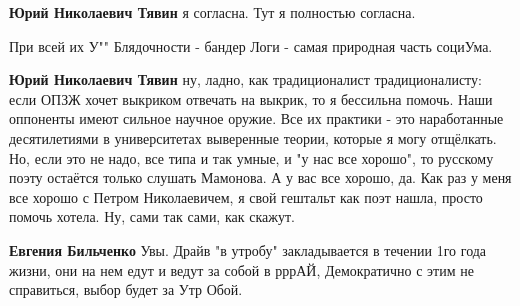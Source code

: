 \begin{itemize}
\begin{itemize}
 
\textbf{Юрий Николаевич Тявин} я согласна. Тут я полностью согласна.

 
При всей их У"" Блядочности - бандер Логи - самая природная часть социУма.

 
\textbf{Юрий Николаевич Тявин} ну, ладно, как традиционалист традиционалисту:
если ОПЗЖ хочет выкриком отвечать на выкрик, то я бессильна помочь. Наши
оппоненты имеют сильное научное оружие. Все их практики - это наработанные
десятилетиями в университетах выверенные теории, которые я могу отщёлкать. Но,
если это не надо, все типа и так умные, и "у нас все хорошо", то русскому поэту
остаётся только слушать Мамонова. А у вас все хорошо, да. Как раз у меня все
хорошо с Петром Николаевичем, я свой гештальт как поэт нашла, просто помочь
хотела. Ну, сами так сами, как скажут.

 
\textbf{Евгения Бильченко} Увы. Драйв "в утробу" закладывается в течении 1го года жизни, они на нем едут и ведут за собой в рррАЙ, Демократично с этим не справиться, выбор будет за Утр Обой.

 

\end{itemize}
\end{itemize}
